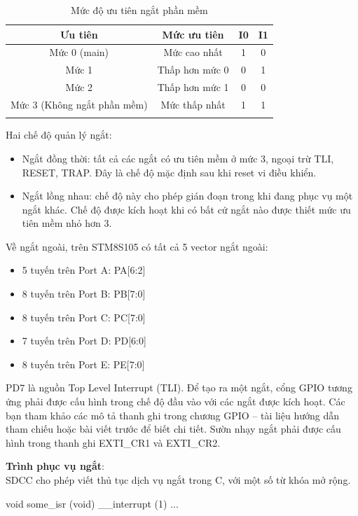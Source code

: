 \begin{longtable}{cccc}
\textbf{Ưu tiên} & \textbf{Mức ưu tiên} & \textbf{I0} & \textbf{I1}\\
\midrule
\endhead
Mức 0 (main) & Mức cao nhất & 1 & 0 \\
Mức 1 & Thấp hơn mức 0 & 0 & 1 \\
Mức 2 & Thấp hơn mức 1 & 0 & 0 \\
Mức 3 (Không ngắt phần mềm) & Mức thấp nhất & 1 & 1 \\
\bottomrule
\caption{Mức độ ưu tiên ngắt phần mềm}
\label{tbl:int_priority}
\end{longtable}

Hai chế độ quản lý ngắt:

\begin{itemize}
\item Ngắt đồng thời: tất cả các ngắt có ưu tiên mềm ở mức 3, ngoại trừ TLI, RESET, TRAP. Đây là chế độ mặc định sau khi reset vi điều khiển.
\item Ngắt lồng nhau: chế độ này cho phép gián đoạn trong khi đang phục vụ một ngắt khác. Chế độ được kích hoạt khi có bất cứ ngắt nào được thiết mức ưu tiên mềm nhỏ hơn 3.
\end{itemize}

Về ngắt ngoài, trên STM8S105 có tất cả 5 vector ngắt ngoài:

\begin{itemize}
\item 5 tuyến trên Port A: PA[6:2]
\item 8 tuyến trên Port B: PB[7:0]
\item 8 tuyến trên Port C: PC[7:0]
\item 7 tuyến trên Port D: PD[6:0]
\item 8 tuyến trên Port E: PE[7:0]
\end{itemize}

PD7 là nguồn Top Level Interrupt (TLI).
Để tạo ra một ngắt, cổng GPIO tương ứng phải được cấu hình trong chế độ đầu vào với các ngắt được kích hoạt.
Các bạn tham khảo các mô tả thanh ghi trong chương GPIO – tài liệu hướng dẫn tham chiếu hoặc bài viết trước để biết chi tiết.
Sườn nhạy ngắt phải được cấu hình trong thanh ghi EXTI\_CR1 và EXTI\_CR2.

\textbf{Trình phục vụ ngắt}:\\
SDCC cho phép viết thủ tục dịch vụ ngắt trong C, với một số từ khóa mở rộng.
\begin{ccode}
void some_isr (void) __interrupt (1)
{
...
}
\end{ccode}

